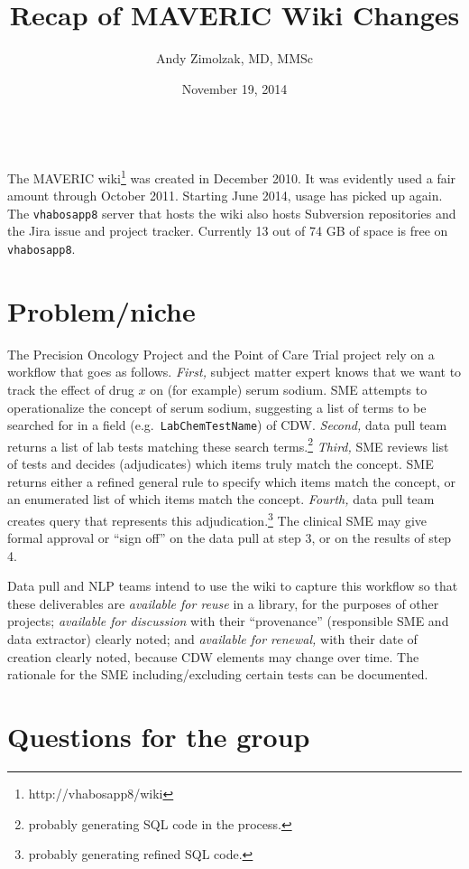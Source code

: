\documentclass{tufte-handout}
\title{Recap of MAVERIC Wiki Changes}
\author{Andy Zimolzak, MD, MMSc}
\date{November 19, 2014}
\begin{document}
\maketitle

~\\

The MAVERIC wiki\footnote{http://vhabosapp8/wiki} was created in
December 2010. It was evidently used a fair amount through October
2011. Starting June 2014, usage has picked up again. The
\texttt{vhabosapp8} server that hosts the wiki also hosts Subversion
repositories and the Jira issue and project tracker. Currently 13 out
of 74 GB of space is free on \texttt{vhabosapp8}.

\section{Problem/niche}

The Precision Oncology Project and the Point of Care Trial project
rely on a workflow that goes as follows. \emph{First,} subject matter
expert knows that we want to track the effect of drug $x$ on (for
example) serum sodium. SME attempts to operationalize the concept of
serum sodium, suggesting a list of terms to be searched for in a field
(e.g.\ \texttt{LabChemTestName}) of CDW. \emph{Second,} data pull team
returns a list of lab tests matching these search
terms.\footnote{probably generating SQL code in the process.}
\emph{Third,} SME reviews list of tests and decides (adjudicates)
which items truly match the concept. SME returns either a refined
general rule to specify which items match the concept, or an
enumerated list of which items match the concept. \emph{Fourth,} data
pull team creates query that represents this
adjudication.\footnote{probably generating refined SQL code.} The
clinical SME may give formal approval or ``sign off'' on the data pull
at step 3, or on the results of step 4.

Data pull and NLP teams intend to use the wiki to capture this
workflow so that these deliverables are \emph{available for reuse} in
a library, for the purposes of other projects; \emph{available for
  discussion} with their ``provenance'' (responsible SME and data
extractor) clearly noted; and \emph{available for renewal,} with their
date of creation clearly noted, because CDW elements may change over
time. The rationale for the SME including/excluding certain tests can
be documented. 

\section{Questions for the group}
\end{document}

